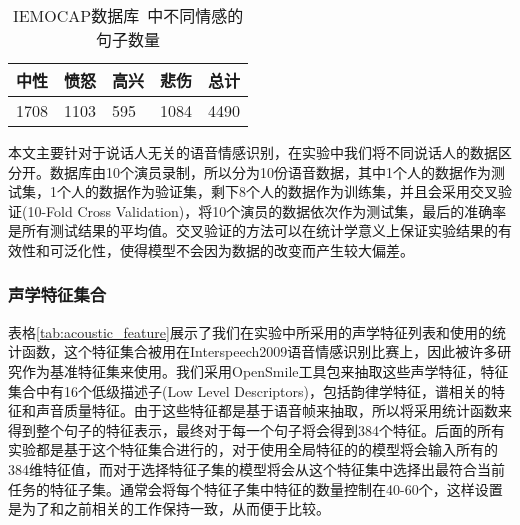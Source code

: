 \begin{table}[htb]
\centering
\begin{minipage}[t]{0.8\linewidth} %
\caption{IEMOCAP数据库~\cite{Busso2008IEMOCAP}中不同情感的句子数量}
\label{tab:emo_sample_num}
    \begin{tabularx}{\linewidth}{X<{\centering} X<{\centering} X<{\centering} X<{\centering} X<{\centering}}
        \toprule[1.5pt]
        中性 & 愤怒 & 高兴 & 悲伤 & 总计 \\
        \midrule[1pt]
        1708 & 1103 & 595 & 1084 & 4490 \\
        \bottomrule[1.5pt]
    \end{tabularx}
\end{minipage}
\end{table}

本文主要针对于说话人无关的语音情感识别，在实验中我们将不同说话人的数据区分开。数据库由10个演员录制，所以分为10份语音数据，其中1个人的数据作为测试集，1个人的数据作为验证集，剩下8个人的数据作为训练集，并且会采用交叉验证(10-Fold Cross Validation)，将10个演员的数据依次作为测试集，最后的准确率是所有测试结果的平均值。交叉验证的方法可以在统计学意义上保证实验结果的有效性和可泛化性，使得模型不会因为数据的改变而产生较大偏差。

\subsubsection{声学特征集合}
\label{sssec:acoustic_feature_set}

表格\ref{tab:acoustic_feature}展示了我们在实验中所采用的声学特征列表和使用的统计函数，这个特征集合被用在Interspeech2009语音情感识别比赛上，因此被许多研究作为基准特征集来使用。我们采用OpenSmile工具包来抽取这些声学特征，特征集合中有16个低级描述子(Low Level Descriptors)，包括韵律学特征，谱相关的特征和声音质量特征。由于这些特征都是基于语音帧来抽取，所以将采用统计函数来得到整个句子的特征表示，最终对于每一个句子将会得到384个特征。后面的所有实验都是基于这个特征集合进行的，对于使用全局特征的的模型将会输入所有的384维特征值，而对于选择特征子集的模型将会从这个特征集中选择出最符合当前任务的特征子集。通常会将每个特征子集中特征的数量控制在40-60个，这样设置是为了和之前相关的工作保持一致，从而便于比较。

